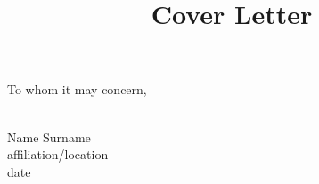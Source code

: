 \documentclass[a4paper,12pt, openright]{article}
\title{        \vspace{-2\baselineskip}%
      Cover Letter}
\date{ }
\begin{document}
%
\maketitle
%
%
To whom it may concern,\\
\\
\lipsum[1-3]
%
\vskip 1.5cm
\begin{flushright}
Name Surname\\
affiliation/location\\
date
\end{flushright}
%
\end{document}
